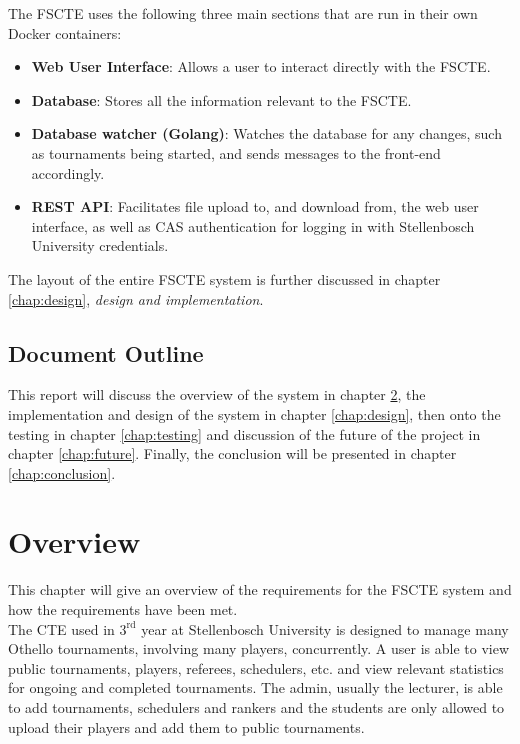 \documentclass[a4paper, 12pt]{report}
\begin{document}
The FSCTE uses the following three main sections that are run in their own
Docker containers:

\begin{itemize}
	\item \textbf{Web User Interface}: Allows a user to interact directly with
	the FSCTE.
	\item \textbf{Database}: Stores all the information relevant to the FSCTE.
	\item \textbf{Database watcher (Golang)}: Watches the database for any changes,
	such as tournaments being started, and sends messages to the front-end
	accordingly.
	\item \textbf{REST API}: Facilitates file upload to, and download from, the
	web user interface, as well as CAS authentication for logging in with
	Stellenbosch University credentials.
\end{itemize}

The layout of the entire FSCTE system is further discussed in chapter
\ref{chap:design}, \emph{design and implementation}.

\section{Document Outline}

This report will discuss the overview of the system in chapter \ref{chap:overview},
the implementation and design of the system in chapter \ref{chap:design}, then
onto the testing in chapter \ref{chap:testing} and discussion of the future of
the project in chapter \ref{chap:future}. Finally, the conclusion will be
presented in chapter \ref{chap:conclusion}.

\chapter{Overview}
\label{chap:overview}

This chapter will give an overview of the requirements for the FSCTE system and
how the requirements have been met. \\

The CTE used in $3^{\text{rd}}$ year at Stellenbosch
University is designed to manage many Othello \cite{othello} tournaments,
involving many players, concurrently. A user is able to view public tournaments,
players, referees, schedulers, etc. and view relevant statistics for
ongoing and completed tournaments. The admin, usually the lecturer, is
able to add tournaments, schedulers and rankers and the students are only allowed
to upload their players and add them to public tournaments.
\end{document}
